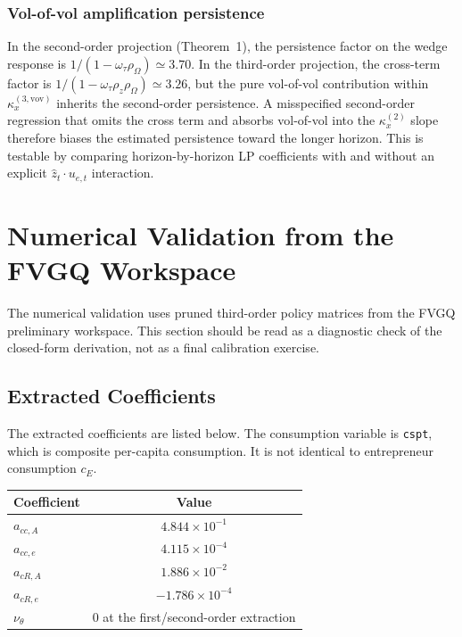 \documentclass[11pt]{article}
\newcommand{\kxtwo}{\kappa_x^{(2)}}
\newcommand{\kxvov}{\kappa_x^{(3,\mathrm{vov})}}
\theoremstyle{plain}
\theoremstyle{definition}
\begin{document}
\subsubsection*{Vol-of-vol amplification persistence}

In the second-order projection (Theorem~1), the persistence factor on the
wedge response is $1/(1-\omega_\tau\rho_\Omega)\simeq 3.70$. In the third-order
projection, the cross-term factor is $1/(1-\omega_\tau\rho_z\rho_\Omega)\simeq
3.26$, but the pure vol-of-vol contribution within $\kxvov$ inherits the
second-order persistence. A misspecified second-order regression that omits the
cross term and absorbs vol-of-vol into the $\kxtwo$ slope therefore biases the
estimated persistence toward the longer horizon. This is testable by comparing
horizon-by-horizon LP coefficients with and without an explicit
$\hat z_t \cdot u_{e,t}$ interaction.

\section{Numerical Validation from the FVGQ Workspace}
\label{sec:numerical-validation}

The numerical validation uses pruned third-order policy matrices from the FVGQ
preliminary workspace. This section should be read as a diagnostic check of the
closed-form derivation, not as a final calibration exercise.

\subsection{Extracted Coefficients}

The extracted coefficients are listed below. The consumption variable is
\texttt{cspt}, which is composite per-capita consumption. It is not identical
to entrepreneur consumption $c_E$.

\begin{center}
\begin{tabular}{lc}
\toprule
Coefficient & Value \\
\midrule
$a_{cc,A}$ & $4.844\times 10^{-1}$ \\
$a_{cc,e}$ & $4.115\times 10^{-4}$ \\
$a_{cR,A}$ & $1.886\times 10^{-2}$ \\
$a_{cR,e}$ & $-1.786\times 10^{-4}$ \\
$\nu_\theta$ & $0$ at the first/second-order extraction \\
\bottomrule
\end{tabular}
\end{center}
\end{document}
